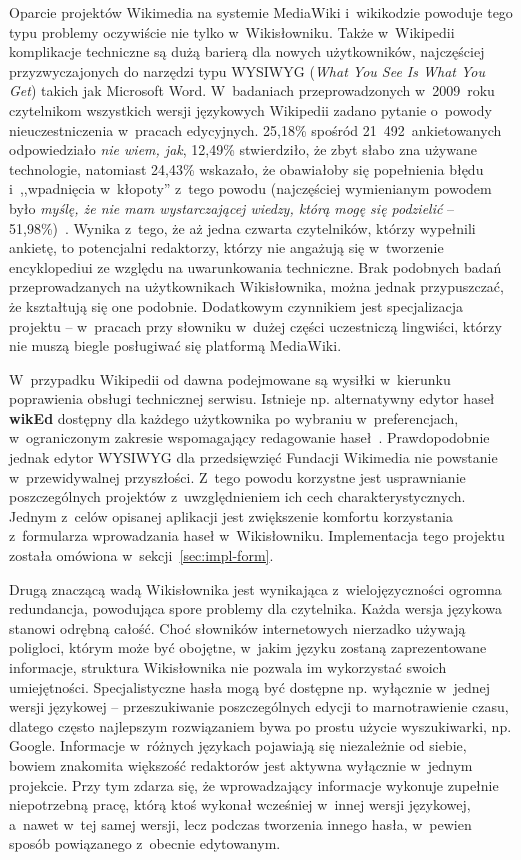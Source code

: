 Oparcie projektów Wikimedia na systemie MediaWiki i~wikikodzie powoduje tego typu problemy oczywiście nie tylko w~Wikisłowniku. Także w~Wikipedii komplikacje techniczne są dużą barierą dla nowych użytkowników, najczęściej przyzwyczajonych do narzędzi typu WYSIWYG (\emph{What You See Is What You Get}) takich jak Microsoft Word. W~badaniach przeprowadzonych w~2009~roku czytelnikom wszystkich wersji językowych Wikipedii zadano pytanie o~powody nieuczestniczenia w~pracach edycyjnych. 25,18\% spośród 21~492~ankietowanych odpowiedziało \emph{nie wiem, jak}, 12,49\% stwierdziło, że zbyt słabo zna używane technologie, natomiast 24,43\% wskazało, że obawiałoby się popełnienia błędu i~,,wpadnięcia w~kłopoty'' z~tego powodu (najczęściej wymienianym powodem było \emph{myślę, że nie mam wystarczającej wiedzy, którą mogę się podzielić} -- 51,98\%)~\cite{wiki:survey}. Wynika z~tego, że aż jedna czwarta czytelników, którzy wypełnili ankietę, to potencjalni redaktorzy, którzy nie angażują się w~tworzenie encyklopediui ze względu na uwarunkowania techniczne. Brak podobnych badań przeprowadzanych na użytkownikach Wikisłownika, można jednak przypuszczać, że kształtują się one podobnie. Dodatkowym czynnikiem jest specjalizacja projektu -- w~pracach przy słowniku w~dużej części uczestniczą lingwiści, którzy nie muszą biegle posługiwać się platformą MediaWiki.

W~przypadku Wikipedii od dawna podejmowane są wysiłki w~kierunku poprawienia obsługi technicznej serwisu. Istnieje np. alternatywny edytor haseł \textbf{wikEd} dostępny dla każdego użytkownika po wybraniu w~preferencjach, w~ograniczonym zakresie wspomagający redagowanie haseł~\cite{wiki:wiked}. Prawdopodobnie jednak edytor WYSIWYG dla przedsięwzięć Fundacji Wikimedia nie powstanie w~przewidywalnej przyszłości. Z~tego powodu korzystne jest usprawnianie poszczególnych projektów z~uwzględnieniem ich cech charakterystycznych. Jednym z~celów opisanej aplikacji jest zwiększenie komfortu korzystania z~formularza wprowadzania haseł w~Wikisłowniku. Implementacja tego projektu została omówiona w~sekcji~\ref{sec:impl-form}.

Drugą znaczącą wadą Wikisłownika jest wynikająca z~wielojęzyczności ogromna redundancja, powodująca spore problemy dla czytelnika. Każda wersja językowa stanowi odrębną całość. Choć słowników internetowych nierzadko używają poligloci, którym może być obojętne, w~jakim języku zostaną zaprezentowane informacje, struktura Wikisłownika nie pozwala im wykorzystać swoich umiejętności. Specjalistyczne hasła mogą być dostępne np. wyłącznie w~jednej wersji językowej -- przeszukiwanie poszczególnych edycji to marnotrawienie czasu, dlatego często najlepszym rozwiązaniem bywa po prostu użycie wyszukiwarki, np. Google. Informacje w~różnych językach pojawiają się niezależnie od siebie, bowiem znakomita większość redaktorów jest aktywna wyłącznie w~jednym projekcie. Przy tym zdarza się, że wprowadzający informacje wykonuje zupełnie niepotrzebną pracę, którą ktoś wykonał wcześniej w~innej wersji językowej, a~nawet w~tej samej wersji, lecz podczas tworzenia innego hasła, w~pewien sposób powiązanego z~obecnie edytowanym.

